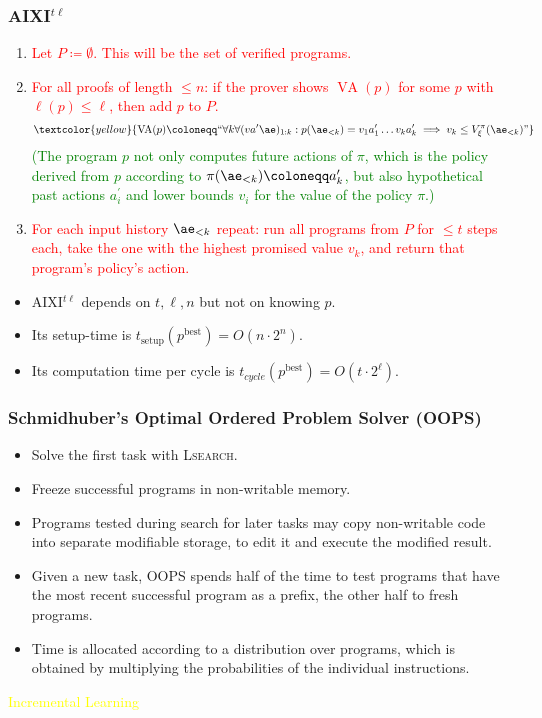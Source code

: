 \documentclass[UTF8,11pt,colorlinks,compress,openany]{beamer}%
\begin{document}
\begin{frame}\frametitle{AIXI$^{t\ell}$}
\begin{enumerate}
	\item \textcolor{red}{Let $P\coloneqq \emptyset$. This will be the set of verified programs.}
	\item \textcolor{red}{For all proofs of length $\leq n$: if the prover shows $\operatorname{VA}(p)$ for some $p$ with $\ell(p)\leq\ell$, then add $p$ to $P$.}
	\[\textcolor{yellow}{\operatorname{VA}(p)\coloneqq ``\forall k\forall(va^\prime\ae)_{1:k}: p(\ae_{<k})=v_1a_1^\prime\dots v_ka_k^\prime\implies v_k\leq V_\xi^\pi(\ae_{<k})"}\]
	\textcolor{green}{(The program $p$ not only computes future actions of $\pi$, which is the policy derived from $p$ according to $\pi(\ae_{<k})\coloneqq a_k^\prime$, but also hypothetical past actions $a_i^\prime$ and lower bounds $v_i$ for the value of the policy $\pi$.)}
	\item \textcolor{red}{For each input history $\ae_{<k}$ repeat: run all programs from $P$ for $\leq t$ steps each, take the one with the highest promised value $v_k$, and return that program's policy's action.}
\end{enumerate}
\begin{itemize}
	\item AIXI$^{t\ell}$ depends on $t,\ell,n$ but not on knowing $p$.
	\item Its setup-time is $t_{\mathrm{setup}}(p^{\mathrm{best}})=O(n\cdot 2^n)$.
	\item Its computation time per cycle is $t_{cycle}(p^{\mathrm{best}})=O(t\cdot 2^\ell)$.
\end{itemize}
\end{frame}

\begin{frame}\frametitle{Schmidhuber's Optimal Ordered Problem Solver (OOPS)}
	\begin{itemize}
		\item Solve the first task with \textsc{Lsearch}.
		\item Freeze successful programs in non-writable memory.
		\item Programs tested during search for later tasks may copy non-writable code into separate modifiable storage, to edit it and execute the modified result.
		\item Given a new task, OOPS spends half of the time to test programs that have the most recent successful program as a prefix, the other half to fresh programs. \item Time is allocated according to a distribution over programs, which is obtained by multiplying the probabilities of the individual instructions.
	\end{itemize}
\centering\textcolor{yellow}{Incremental Learning}
\end{frame}
\end{document}
